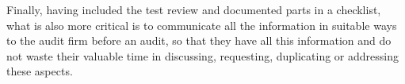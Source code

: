 Finally, having included the test review and documented parts in a
checklist, what is also more critical is to communicate all the
information in suitable ways to the audit firm before an audit, so that
they have all this information and do not waste their valuable time in
discussing, requesting, duplicating or addressing these aspects.
